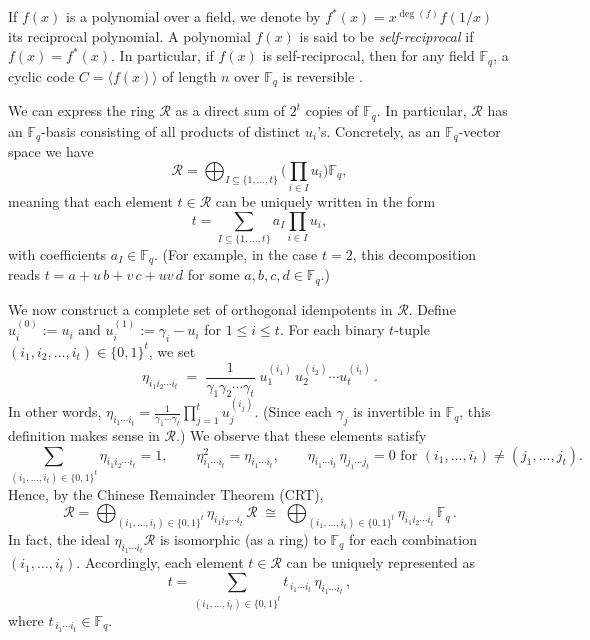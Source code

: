 \documentclass[12pt]{article}
\begin{document}
If $f(x)$ is a polynomial over a field, we denote by $f^*(x) = x^{\deg(f)} f(1/x)$ its reciprocal polynomial. A polynomial $f(x)$ is said to be \textit{self-reciprocal} if $f(x) = f^*(x)$. In particular, if $f(x)$ is self-reciprocal, then for any field $\mathbb{F}_q$, a cyclic code $C = \langle f(x)\rangle$ of length $n$ over $\mathbb{F}_q$ is reversible \cite{15}.

We can express the ring $\mathcal{R}$ as a direct sum of $2^t$ copies of $\mathbb{F}_q$. In particular, $\mathcal{R}$ has an $\mathbb{F}_q$-basis consisting of all products of distinct $u_i$’s. Concretely, as an $\mathbb{F}_q$-vector space we have
\[ 
\mathcal{R} = \bigoplus_{I \subseteq \{1,\ldots,t\}} \Big(\prod_{i \in I} u_i\Big) \mathbb{F}_q,
\] 
meaning that each element $t \in \mathcal{R}$ can be uniquely written in the form 
\[ 
t = \sum_{I \subseteq \{1,\ldots,t\}} a_I \prod_{i \in I} u_i,
\] 
with coefficients $a_I \in \mathbb{F}_q$. (For example, in the case $t=2$, this decomposition reads $t = a + u\,b + v\,c + uv\,d$ for some $a,b,c,d \in \mathbb{F}_q$.)

We now construct a complete set of orthogonal idempotents in $\mathcal{R}$. Define $u_i^{(0)} := u_i$ and $u_i^{(1)} := \gamma_i - u_i$ for $1 \le i \le t$. For each binary $t$-tuple $(i_1,i_2,\ldots,i_t) \in \{0,1\}^t$, we set 
\[ 
\eta_{i_1 i_2 \cdots i_t} \;=\; \frac{1}{\gamma_1 \gamma_2 \cdots \gamma_t}\; u_1^{(i_1)}\, u_2^{(i_2)} \cdots u_t^{(i_t)}\,.
\] 
In other words, $\eta_{i_1\cdots i_t} = \frac{1}{\gamma_1 \cdots \gamma_t} \prod_{j=1}^t u_j^{(i_j)}$. (Since each $\gamma_j$ is invertible in $\mathbb{F}_q$, this definition makes sense in $\mathcal{R}$.) We observe that these elements satisfy
\[
\sum_{(i_1,\ldots,i_t) \in \{0,1\}^t} \eta_{i_1 i_2 \cdots i_t} = 1, \qquad 
\eta_{i_1 \cdots i_t}^2 = \eta_{i_1 \cdots i_t}, \qquad 
\eta_{i_1 \cdots i_t}\, \eta_{j_1 \cdots j_t} = 0 \text{ for } (i_1,\ldots,i_t) \neq (j_1,\ldots,j_t).
\]
Hence, by the Chinese Remainder Theorem (CRT),
\[
\mathcal{R} = \bigoplus_{(i_1,\ldots,i_t) \in \{0,1\}^t} \eta_{i_1 i_2 \cdots i_t}\, \mathcal{R} \;\cong\; \bigoplus_{(i_1,\ldots,i_t) \in \{0,1\}^t} \eta_{i_1 i_2 \cdots i_t}\, \mathbb{F}_q\,.
\] 
In fact, the ideal $\eta_{i_1 \cdots i_t} \mathcal{R}$ is isomorphic (as a ring) to $\mathbb{F}_q$ for each combination $(i_1,\ldots,i_t)$. Accordingly, each element $t \in \mathcal{R}$ can be uniquely represented as
\[
t = \sum_{(i_1,\ldots,i_t) \in \{0,1\}^t} t_{\,i_1 \cdots i_t}\, \eta_{i_1 \cdots i_t}\,,
\] 
where $t_{\,i_1 \cdots i_t} \in \mathbb{F}_q$.
\end{document}
